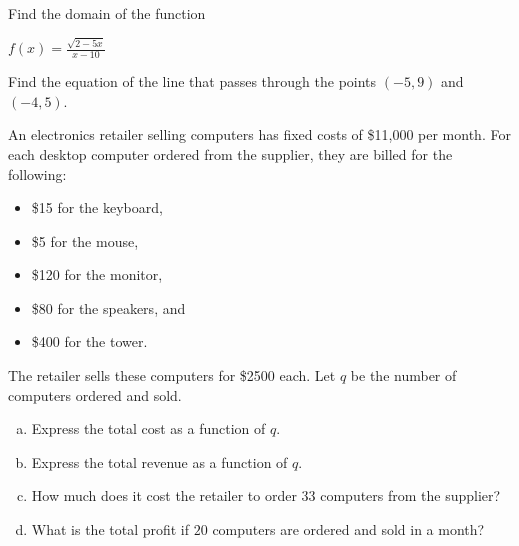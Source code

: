 \documentclass[11pt]{exam}
\newcommand{\ds}{\displaystyle}
\newcommand{\vsp}{\vspace{0.5cm}}
\begin{document}
\begin{questions}

\setlength\answerskip{0pt}

\addpoints
\question[3] Find the domain of the function
\begin{center}
$\ds{f(x) = \frac{\sqrt{2-5x}}{x - 10}}$
\end{center}
\vfill

\question[3] Find the equation of the line that passes through the points $(-5,9)$ and $(-4,5)$.
\vspace{3cm}
\newpage

\question[4] An electronics retailer selling computers has fixed costs of \$11,000 per month.  For each desktop computer ordered from the supplier, they are billed for the following:
\begin{itemize}
\item \$15 for the keyboard,
\item \$5 for the mouse,
\item \$120 for the monitor, 
\item \$80 for the speakers, and
\item \$400 for the tower.
\end{itemize}
\vsp

\noindent The retailer sells these computers for \$2500 each.  Let $q$ be the number of computers ordered and sold.

\begin{enumerate}[(a)]
\item Express the total cost as a function of $q$.
\vfill

\item Express the total revenue as a function of $q$.
\vfill

\item How much does it cost the retailer to order 33 computers from the supplier?
\vfill

\item What is the total profit if $20$ computers are ordered and sold in a month?
\vfill
\end{enumerate}
\end{questions}
\end{document}
